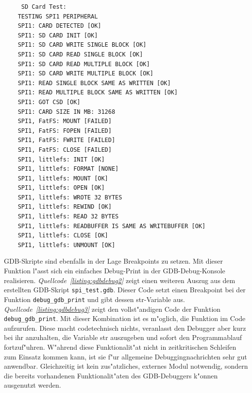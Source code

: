 \documentclass[11pt]{article}
\newcommand*{\coderef}[1]{\textit{Quellcode~\ref{#1}}}
\newcommand{\cpp}[1]{\texttt{#1}}
\begin{document}
\begin{listing}[H]
    \begin{verbatim}
     SD Card Test:
    TESTING SPI1 PERIPHERAL
    SPI1: CARD DETECTED [OK]
    SPI1: SD CARD INIT [OK]
    SPI1: SD CARD WRITE SINGLE BLOCK [OK]
    SPI1: SD CARD READ SINGLE BLOCK [OK]
    SPI1: SD CARD READ MULTIPLE BLOCK [OK]
    SPI1: SD CARD WRITE MULTIPLE BLOCK [OK]
    SPI1: READ SINGLE BLOCK SAME AS WRITTEN [OK]
    SPI1: READ MULTIPLE BLOCK SAME AS WRITTEN [OK]
    SPI1: GOT CSD [OK]
    SPI1: CARD SIZE IN MB: 31268
    SPI1, FatFS: MOUNT [FAILED]
    SPI1, FatFS: FOPEN [FAILED]
    SPI1, FatFS: FWRITE [FAILED]
    SPI1, FatFS: CLOSE [FAILED]
    SPI1, littlefs: INIT [OK]
    SPI1, littlefs: FORMAT [NONE]
    SPI1, littlefs: MOUNT [OK]
    SPI1, littlefs: OPEN [OK]
    SPI1, littlefs: WROTE 32 BYTES
    SPI1, littlefs: REWIND [OK]
    SPI1, littlefs: READ 32 BYTES
    SPI1, littlefs: READBUFFER IS SAME AS WRITEBUFFER [OK]
    SPI1, littlefs: CLOSE [OK]
    SPI1, littlefs: UNMOUNT [OK]
    \end{verbatim}
\caption{Debugausgabe von \texttt{test/spi\_test.cpp} durch Anwendung von \texttt{spi\_test.gdb}}
\label{listing:gdbdebugausgabe}
\end{listing}


GDB-Skripte sind ebenfalls in der Lage Breakpoints zu setzen. Mit dieser Funktion l"asst sich 
ein einfaches Debug-Print in der GDB-Debug-Konsole realisieren.
\coderef{listing:gdbdebug2} zeigt einen weiteren Auszug aus dem erstellten GDB-Skript \texttt{spi\_test.gdb}.
Dieser Code setzt einen Breakpoint bei der Funktion \cpp{debug_gdb_print} und gibt dessen str-Variable aus.
\coderef{listing:gdbdebug3} zeigt den vollst"andigen Code der Funktion \cpp{debug_gdb_print}. Mit dieser
Kombination ist es m"oglich, die Funktion im Code aufzurufen. Diese macht codetechnisch nichts, veranlasst
den Debugger aber kurz bei ihr anzuhalten, die Variable str auszugeben und sofort den Programmablauf fortzuf"uhren.
W"ahrend diese Funktionalit"at nicht in zeitkritischen Schleifen zum Einsatz kommen kann, ist sie f"ur
allgemeine Debuggingnachrichten sehr gut anwendbar. Gleichzeitig ist kein zus"atzliches, externes Modul
notwendig, sondern die bereits vorhandenen Funktionalit"aten des GDB-Debuggers k"onnen ausgenutzt werden. 
\end{document}
